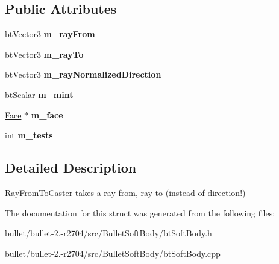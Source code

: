 \subsection*{Public Attributes}
\begin{DoxyCompactItemize}
\item 
\hypertarget{structbt_soft_body_1_1_ray_from_to_caster_ab3ff09a98d5e68aba2263e273f322b54}{bt\+Vector3 {\bfseries m\+\_\+ray\+From}}\label{structbt_soft_body_1_1_ray_from_to_caster_ab3ff09a98d5e68aba2263e273f322b54}

\item 
\hypertarget{structbt_soft_body_1_1_ray_from_to_caster_a8d6bc6ea5ac0af8f69a2a1fbe5c90330}{bt\+Vector3 {\bfseries m\+\_\+ray\+To}}\label{structbt_soft_body_1_1_ray_from_to_caster_a8d6bc6ea5ac0af8f69a2a1fbe5c90330}

\item 
\hypertarget{structbt_soft_body_1_1_ray_from_to_caster_aaeb2327d0033ed8ee400e9fef264417d}{bt\+Vector3 {\bfseries m\+\_\+ray\+Normalized\+Direction}}\label{structbt_soft_body_1_1_ray_from_to_caster_aaeb2327d0033ed8ee400e9fef264417d}

\item 
\hypertarget{structbt_soft_body_1_1_ray_from_to_caster_a30f1a9893610c9f60388fea3d115a53e}{bt\+Scalar {\bfseries m\+\_\+mint}}\label{structbt_soft_body_1_1_ray_from_to_caster_a30f1a9893610c9f60388fea3d115a53e}

\item 
\hypertarget{structbt_soft_body_1_1_ray_from_to_caster_a1857b969f47f52d8fb5607bf943836af}{\hyperlink{structbt_soft_body_1_1_face}{Face} $\ast$ {\bfseries m\+\_\+face}}\label{structbt_soft_body_1_1_ray_from_to_caster_a1857b969f47f52d8fb5607bf943836af}

\item 
\hypertarget{structbt_soft_body_1_1_ray_from_to_caster_a3363fdfd71f927b7f1af70bf16843194}{int {\bfseries m\+\_\+tests}}\label{structbt_soft_body_1_1_ray_from_to_caster_a3363fdfd71f927b7f1af70bf16843194}

\end{DoxyCompactItemize}


\subsection{Detailed Description}
\hyperlink{structbt_soft_body_1_1_ray_from_to_caster}{Ray\+From\+To\+Caster} takes a ray from, ray to (instead of direction!) 

The documentation for this struct was generated from the following files\+:\begin{DoxyCompactItemize}
\item 
bullet/bullet-\/2.-\/r2704/src/\+Bullet\+Soft\+Body/bt\+Soft\+Body.\+h\item 
bullet/bullet-\/2.-\/r2704/src/\+Bullet\+Soft\+Body/bt\+Soft\+Body.\+cpp\end{DoxyCompactItemize}
